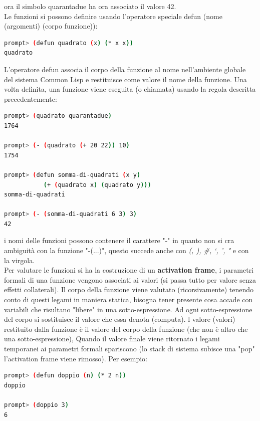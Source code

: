 \documentclass[a4paper,12pt, oneside]{book}
\begin{document}
ora il simbolo quarantadue ha ora associato il valore 42.\\
Le funzioni si possono definire usando l'operatore speciale defun (nome (argomenti) (corpo funzione)):
\begin{shaded}
	\begin{lstlisting}[language=bash]
prompt> (defun quadrato (x) (* x x))
quadrato
\end{lstlisting}
\end{shaded}
L'operatore defun associa il corpo della funzione al nome
nell'ambiente globale del sistema Common Lisp e restituisce come valore il nome della funzione. Una volta definita, una funzione viene eseguita (o chiamata) usando la regola descritta precedentemente:
\begin{shaded}
	\begin{lstlisting}[language=bash]
prompt> (quadrato quarantadue)
1764

prompt> (- (quadrato (+ 20 22)) 10)
1754

prompt> (defun somma-di-quadrati (x y)
           (+ (quadrato x) (quadrato y)))
somma-di-quadrati

prompt> (- (somma-di-quadrati 6 3) 3)
42
\end{lstlisting}
\end{shaded}
i nomi delle funzioni possono contenere il carattere "-" in quanto non si cra ambiguità con la funzione "-(...)", questo succede anche con \textit{(, ), \#, ‘, ', "} e con la virgola.\\
Per valutare le funzioni si ha la costruzione di un \textbf{activation frame}, i parametri formali di una funzione vengono associati ai valori (si passa tutto per valore senza effetti collaterali). Il corpo della funzione viene valutato (ricorsivamente) tenendo conto di questi legami in maniera statica, bisogna tener presente cosa accade con variabili che risultano
"libere" in una sotto-espressione. Ad ogni sotto-espressione del corpo si sostituisce il valore che essa denota (computa). l valore (valori) restituito dalla funzione è il valore del corpo della funzione (che non è altro che una sotto-espressione), Quando il valore finale viene ritornato i legami temporanei ai parametri formali spariscono (lo stack di sistema subisce una "pop" l'activation frame viene rimosso). Per esempio:
\begin{shaded}
	\begin{lstlisting}[language=bash]
prompt> (defun doppio (n) (* 2 n))
doppio

prompt> (doppio 3)
6
\end{lstlisting}
\end{shaded}
\end{document}
